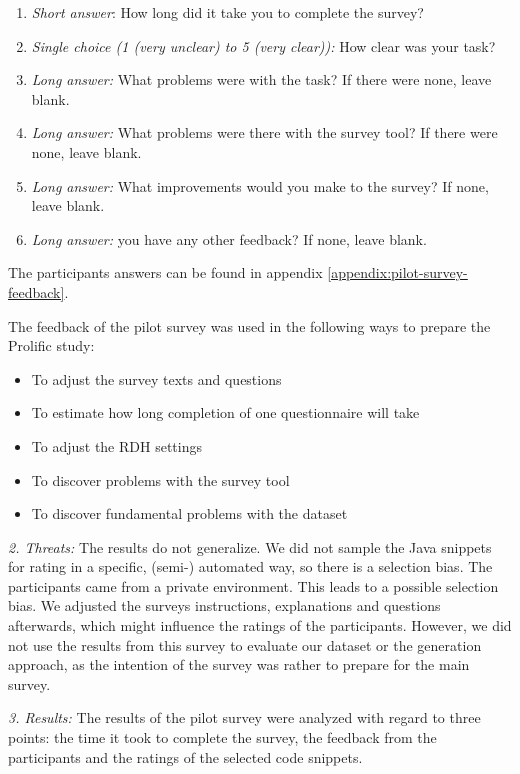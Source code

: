 \documentclass[%
class=scrreprt,
chapterprefix=false,%
open=right,%
twoside=false,%
paper=a4,%
logofile={Logo\_zentral\_farbig\_EN.png},%
thesistype=master,%
UKenglish,%
]{se2thesis}
\theoremstyle{definition}
\begin{document}
	\begin{enumerate}
		\item \textit{Short answer}: How long did it take you to complete the survey?
		\item \textit{Single choice (1 (very unclear) to 5 (very clear)):} How clear was your task?
		\item \textit{Long answer:} What problems were with the task? If there were none, leave blank.
		\item \textit{Long answer:} What problems were there with the survey tool? If there were none, leave blank.
		\item \textit{Long answer:} What improvements would you make to the survey? If none, leave blank.
		\item \textit{Long answer:}  you have any other feedback? If none, leave blank.
	\end{enumerate}
	The participants answers can be found in appendix \ref{appendix:pilot-survey-feedback}.
	
	The feedback of the pilot survey was used in the following ways to prepare the Prolific study:
	\begin{itemize}
		\item To adjust the survey texts and questions
		\item To estimate how long completion of one questionnaire will take
		\item To adjust the RDH settings
		\item To discover problems with the survey tool
		\item To discover fundamental problems with the dataset
	\end{itemize}
	
	\textit{2. Threats:}
	The results do not generalize. We did not sample the Java snippets for rating in a specific, (semi-) automated way, so there is a selection bias. The participants came from a private environment. This leads to a possible selection bias.
	We adjusted the surveys instructions, explanations and questions afterwards, which might influence the ratings of the participants.
	However, we did not use the results from this survey to evaluate our dataset or the generation approach, as the intention of the survey was rather to prepare for the main survey. 
	
	\textit{3. Results:}
	The results of the pilot survey were analyzed with regard to three points: the time it took to complete the survey, the feedback from the participants and the ratings of the selected code snippets.
	
\end{document}

